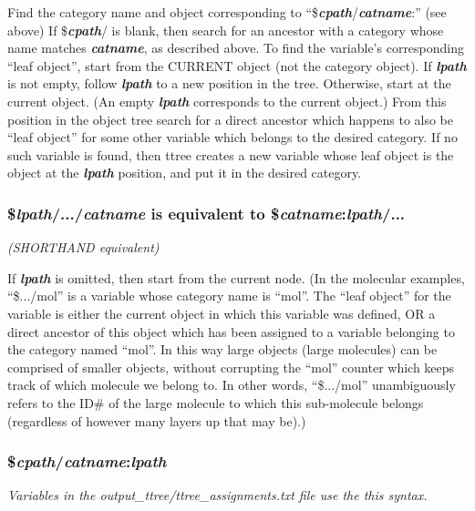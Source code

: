 \documentclass[11pt]{article}
\begin{document}
Find the category name and object corresponding to ``\$\textit{\textbf{cpath}}/\textit{\textbf{catname}}:''
(see above)
If \$\textit{\textbf{cpath}}/ is blank, then search for an ancestor with a category whose name matches \textit{\textbf{catname}}, as described above.
To find the variable's corresponding ``leaf object'', start from the CURRENT object (not the category object).  If \textit{\textbf{lpath}} is not empty, follow \textit{\textbf{lpath}} to a new position in the tree.  Otherwise, start at the current object.  (An empty \textit{\textbf{lpath}} corresponds to the current object.)  From this position in the object tree search for a direct ancestor which happens to also be ``leaf object'' for some other variable which belongs to the desired category.  If no such variable is found, then ttree creates a new variable whose leaf object is the object at the \textit{\textbf{lpath}} position, and put it in the desired category.

\subsubsection*{\$\textit{\textbf{lpath}}/.../\textit{\textbf{catname}} is equivalent to \$\textit{\textbf{catname}}:\textit{\textbf{lpath}}/...}
\textit{(SHORTHAND equivalent)}

If \textit{\textbf{lpath}} is omitted, then start from the current node.
(In the molecular examples, ``\$.../mol'' is a variable whose category name is ``mol''.  The ``leaf object'' for the variable is either the current object in which this variable was defined, OR a direct ancestor of this object which has been assigned to a variable belonging to the category named ``mol''.  In this way large objects (large molecules) can be comprised of smaller objects, without corrupting the ``mol'' counter which keeps track of which molecule we belong to.  In other words, ``\$.../mol'' unambiguously refers to the ID\# of the large molecule to which this sub-molecule belongs (regardless of however many layers up that may be).)

\subsubsection*{\$\textit{\textbf{cpath}}/\textit{\textbf{catname}}:\textit{\textbf{lpath}}}
\textit{Variables in the output\_ttree/ttree\_assignments.txt file 
        use the this syntax.}
\end{document}
